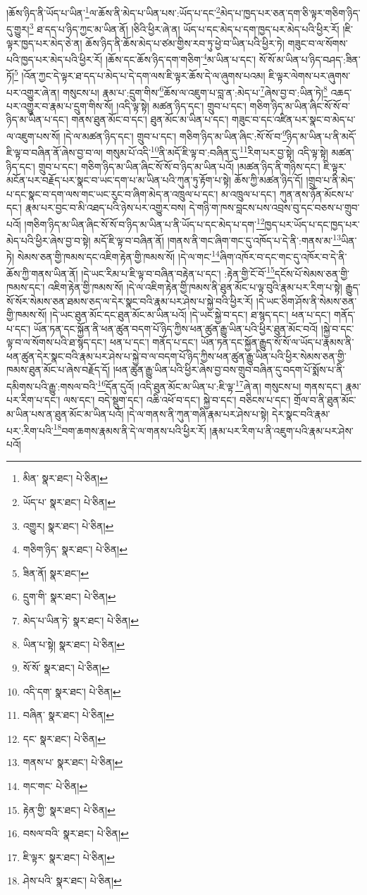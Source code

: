 །ཆོས་ཉིད་ནི་ཡོད་པ་ཡིན་\footnote{མིན་  སྣར་ཐང་།  པེ་ཅིན། }ལ་ཆོས་ནི་མེད་པ་ཡིན་པས་:ཡོད་པ་དང་\footnote{ཡོད་པ་  སྣར་ཐང་།  པེ་ཅིན། }མེད་པ་ཁྱད་པར་ཅན་དག་ཅི་ལྟར་གཅིག་ཉིད་དུ་གྱུར།\footnote{འགྱུར།  སྣར་ཐང་།  པེ་ཅིན། } ཐ་དད་པ་ཉིད་ཀྱང་མ་ཡིན་ནོ། །ཅིའི་ཕྱིར་ཞེ་ན། ཡོད་པ་དང་མེད་པ་དག་ཁྱད་པར་མེད་པའི་ཕྱིར་རོ། །ཇི་ལྟར་ཁྱད་པར་མེད་ཅེ་ན། ཆོས་ཉིད་ནི་ཆོས་མེད་པ་ཙམ་གྱིས་རབ་ཏུ་ཕྱེ་བ་ཡིན་པའི་ཕྱིར་ཏེ། གཟུང་བ་ལ་སོགས་པའི་ཁྱད་པར་མེད་པའི་ཕྱིར་རོ། །ཆོས་དང་ཆོས་ཉིད་དག་གཅིག་\footnote{གཅིག་ཉིད་  སྣར་ཐང་།  པེ་ཅིན། }མ་ཡིན་པ་དང་། སོ་སོ་མ་ཡིན་པ་ཉིད་བཤད་:ཟིན་ཏོ།\footnote{ཟིན་ནོ།  སྣར་ཐང་། } །འོན་ཀྱང་དེ་ལྟར་ཐ་དད་པ་མེད་པ་དེ་དག་ལས་ཇི་ལྟར་ཆོས་དེ་ལ་ཞུགས་པའམ། ཇི་ལྟར་ལེགས་པར་ཞུགས་པར་འགྱུར་ཞེ་ན། གསུངས་པ། རྣམ་པ་:དྲུག་གིས་\footnote{དྲུག་གི་  སྣར་ཐང་།  པེ་ཅིན། }ཆོས་ལ་འཇུག་པ་བླ་ན་:མེད་པ་\footnote{མེད་པ་ཡིན་ཏེ་  སྣར་ཐང་།  པེ་ཅིན། }ཞེས་བྱ་བ་:ཡིན་ཏེ།\footnote{ཡིན་པ་སྟེ།  སྣར་ཐང་།  པེ་ཅིན། } འཆད་པར་འགྱུར་བ་རྣམ་པ་དྲུག་གིས་སོ། །འདི་ལྟ་སྟེ། མཚན་ཉིད་དང་། གྲུབ་པ་དང་། གཅིག་ཉིད་མ་ཡིན་ཞིང་སོ་སོ་བ་ཉིད་མ་ཡིན་པ་དང་། གནས་ཐུན་མོང་བ་དང་། ཐུན་མོང་མ་ཡིན་པ་དང་། གཟུང་བ་དང་འཛིན་པར་སྣང་བ་མེད་པ་ལ་འཇུག་པས་སོ། །དེ་ལ་མཚན་ཉིད་དང་། གྲུབ་པ་དང་། གཅིག་ཉིད་མ་ཡིན་ཞིང་:སོ་སོ་བ་\footnote{སོ་སོ་  སྣར་ཐང་།  པེ་ཅིན། }ཉིད་མ་ཡིན་པ་ནི་མདོ་ཇི་ལྟ་བ་བཞིན་ནོ་ཞེས་བྱ་བ་ལ། གསུམ་པོ་འདི་\footnote{འདི་དག་  སྣར་ཐང་།  པེ་ཅིན། }ནི་མདོ་ཇི་ལྟ་བ་:བཞིན་དུ་\footnote{བཞིན་  སྣར་ཐང་།  པེ་ཅིན། }རིག་པར་བྱ་སྟེ། འདི་ལྟ་སྟེ། མཚན་ཉིད་དང་། གྲུབ་པ་དང་། གཅིག་ཉིད་མ་ཡིན་ཞིང་སོ་སོ་བ་ཉིད་མ་ཡིན་པའོ། །མཚན་ཉིད་ནི་གཉིས་དང་། ཇི་ལྟར་མངོན་པར་བརྗོད་པར་སྣང་བ་ཡང་དག་པ་མ་ཡིན་པའི་ཀུན་ཏུ་རྟོག་པ་སྟེ། ཆོས་ཀྱི་མཚན་ཉིད་དོ། །གྲུབ་པ་ནི་མེད་པ་དང་སྣང་བ་དག་ལས་གང་ཡང་རུང་བ་ཞིག་མེད་ན་འཁྲུལ་པ་དང་། མ་འཁྲུལ་པ་དང་། ཀུན་ནས་ཉོན་མོངས་པ་དང་། རྣམ་པར་བྱང་བ་མི་འཐད་པའི་ཉེས་པར་འགྱུར་བས། དེ་གཉི་ག་ཁས་བླངས་པས་འབྲས་བུ་དང་བཅས་པ་གྲུབ་པའོ། །གཅིག་ཉིད་མ་ཡིན་ཞིང་སོ་སོ་བ་ཉིད་མ་ཡིན་པ་ནི་ཡོད་པ་དང་མེད་པ་དག་\footnote{དང་  སྣར་ཐང་།  པེ་ཅིན། }ཁྱད་པར་ཡོད་པ་དང་ཁྱད་པར་མེད་པའི་ཕྱིར་ཞེས་བྱ་བ་སྟེ། མདོ་ཇི་ལྟ་བ་བཞིན་ནོ། །གནས་ནི་གང་ཞིག་གང་དུ་འཁོད་པ་དེ་ནི་:གནས་མ་\footnote{གནས་པ་  སྣར་ཐང་།  པེ་ཅིན། }ཡིན་ཏེ། སེམས་ཅན་གྱི་ཁམས་དང་འཇིག་རྟེན་གྱི་ཁམས་སོ། །དེ་ལ་གང་\footnote{གང་གང་  པེ་ཅིན། }ཞིག་འཁོར་བ་དང་གང་དུ་འཁོར་བ་དེ་ནི་ཆོས་ཀྱི་གནས་ཡིན་ནོ། །དེ་ཡང་རིམ་པ་ཇི་ལྟ་བ་བཞིན་བརྟེན་པ་དང་། :རྟེན་གྱི་ངོ་བོ་\footnote{རྟེན་གྱི་  སྣར་ཐང་།  པེ་ཅིན། }དངོས་པོ་སེམས་ཅན་གྱི་ཁམས་དང་། འཇིག་རྟེན་གྱི་ཁམས་སོ། །དེ་ལ་འཇིག་རྟེན་གྱི་ཁམས་ནི་ཐུན་མོང་པ་ལྟ་བུའི་རྣམ་པར་རིག་པ་སྟེ། རྒྱུད་སོ་སོར་སེམས་ཅན་ཐམས་ཅད་ལ་དེར་སྣང་བའི་རྣམ་པར་ཤེས་པ་སྐྱེ་བའི་ཕྱིར་རོ། །དེ་ཡང་ཅིག་ཤོས་ནི་སེམས་ཅན་གྱི་ཁམས་སོ། །དེ་ཡང་ཐུན་མོང་དང་ཐུན་མོང་མ་ཡིན་པའོ། །དེ་ཡང་སྐྱེ་བ་དང་། ཐ་སྙད་དང་། ཕན་པ་དང་། གནོད་པ་དང་། ཡོན་ཏན་དང་སྐྱོན་ནི་ཕན་ཚུན་བདག་པོ་ཉིད་ཀྱིས་ཕན་ཚུན་རྒྱུ་ཡིན་པའི་ཕྱིར་ཐུན་མོང་བའོ། །སྐྱེ་བ་དང་ལྟ་བ་ལ་སོགས་པའི་ཐ་སྙད་དང་། ཕན་པ་དང་། གནོད་པ་དང་། ཡོན་ཏན་དང་སྐྱོན་རྒྱུད་སོ་སོ་ལ་ཡོད་པ་རྣམས་ནི་ཕན་ཚུན་དེར་སྣང་བའི་རྣམ་པར་ཤེས་པ་སྐྱེ་བ་ལ་བདག་པོ་ཉིད་ཀྱིས་ཕན་ཚུན་རྒྱུ་ཡིན་པའི་ཕྱིར་སེམས་ཅན་གྱི་ཁམས་ཐུན་མོང་པ་ཞེས་བརྗོད་དོ། །ཕན་ཚུན་རྒྱུ་ཡིན་པའི་ཕྱིར་ཞེས་བྱ་བས་གྲུབ་བཞིན་དུ་བདག་པོ་སྨོས་པ་ནི་དམིགས་པའི་རྒྱུ་:གསལ་བའི་\footnote{བསལ་བའི་  སྣར་ཐང་།  པེ་ཅིན། }དོན་དུའོ། །འདི་ཐུན་མོང་མ་ཡིན་པ་:ཇི་ལྟ་\footnote{ཇི་ལྟར་  སྣར་ཐང་།  པེ་ཅིན། }ཞེ་ན། གསུངས་པ། གནས་དང་། རྣམ་པར་རིག་པ་དང་། ལས་དང་། བདེ་སྡུག་དང་། འཆི་འཕོ་བ་དང་། སྐྱེ་བ་དང་། བཅིངས་པ་དང་། གྲོལ་བ་ནི་ཐུན་མོང་མ་ཡིན་པས་ན་ཐུན་མོང་མ་ཡིན་པའོ། །དེ་ལ་གནས་ནི་ཀུན་གཞི་རྣམ་པར་ཤེས་པ་སྟེ། དེར་སྣང་བའི་རྣམ་པར་:རིག་པའི་\footnote{ཤེས་པའི་  སྣར་ཐང་།  པེ་ཅིན། }བག་ཆགས་རྣམས་ནི་དེ་ལ་གནས་པའི་ཕྱིར་རོ། །རྣམ་པར་རིག་པ་ནི་འཇུག་པའི་རྣམ་པར་ཤེས་པའོ། 